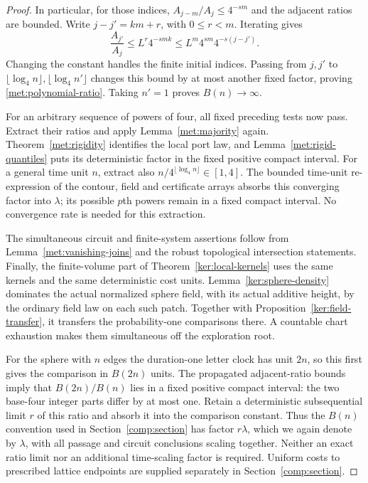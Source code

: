 \documentclass[11pt]{article}
\numberwithin{equation}{section}
\theoremstyle{definition}
\theoremstyle{remark}
\newcommand{\1}{\mathbf 1}
\begin{document}
\begin{proof}
In particular, for those indices,
$A_{j-m}/A_j\leq4^{-sm}$ and the adjacent ratios are bounded.
Write $j-j'=km+r$, with $0\leq r<m$.  Iterating gives
\[
 \frac{A_{j'}}{A_j}\leq L^r4^{-smk}
 \leq L^m4^{sm}4^{-s(j-j')}.
\]
Changing the constant handles the finite initial indices.  Passing
from $j,j'$ to $\lfloor\log_4n\rfloor,
\lfloor\log_4n'\rfloor$ changes this bound by at most another
fixed factor, proving \eqref{met:polynomial-ratio}.
Taking $n'=1$ proves $B(n)\to\infty$.

For an arbitrary sequence of powers of four, all fixed preceding
tests now pass.  Extract their ratios and apply
Lemma~\ref{met:majority} again.  Theorem~\ref{met:rigidity}
identifies the local port law, and
Lemma~\ref{met:rigid-quantiles} puts its deterministic factor in
the fixed positive compact interval.  For a general time unit
$n$, extract also $n/4^{\lfloor\log_4n\rfloor}\in[1,4]$.
The bounded time-unit re-expression of the contour, field and
certificate arrays absorbs this converging factor into $\lambda$;
its possible $p$th powers remain in a fixed compact interval.
No convergence rate is needed for this extraction.

The simultaneous circuit and finite-system assertions follow from
Lemma~\ref{met:vanishing-joins} and the robust topological
intersection statements.  Finally, the finite-volume part of
Theorem~\ref{ker:local-kernels} uses the same kernels and the same
deterministic cost units.  Lemma~\ref{ker:sphere-density}
dominates the actual normalized sphere field, with its actual
additive height, by the ordinary field law on each such patch.
Together with Proposition~\ref{ker:field-transfer}, it transfers
the probability-one comparisons there.  A countable chart exhaustion makes them
simultaneous off the exploration root.

For the sphere with $n$ edges the duration-one letter clock has unit
$2n$, so this first gives the comparison in $B(2n)$ units.
The propagated adjacent-ratio bounds imply that $B(2n)/B(n)$ lies
in a fixed positive compact interval: the two base-four integer
parts differ by at most one.  Retain a deterministic subsequential
limit $r$ of this ratio and absorb it into the comparison constant.
Thus the $B(n)$ convention used in Section~\ref{comp:section} has
factor $r\lambda$, which we again denote by $\lambda$, with all
passage and circuit conclusions scaling together.  Neither an exact
ratio limit nor an additional time-scaling factor is required.
Uniform costs to prescribed
lattice endpoints are supplied separately in
Section~\ref{comp:section}.
\end{proof}
\end{document}
